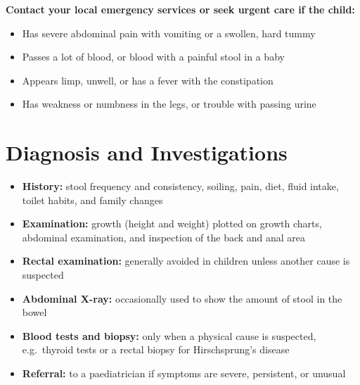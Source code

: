 \textbf{Contact your local emergency services or seek urgent care if the child:}
\begin{itemize}
    \item Has severe abdominal pain with vomiting or a swollen, hard tummy
    \item Passes a lot of blood, or blood with a painful stool in a baby
    \item Appears limp, unwell, or has a fever with the constipation
    \item Has weakness or numbness in the legs, or trouble with passing urine
\end{itemize}

\section*{Diagnosis and Investigations}
\begin{itemize}
    \item \textbf{History:} stool frequency and consistency, soiling, pain, diet, fluid intake, toilet habits, and family changes
    \item \textbf{Examination:} growth (height and weight) plotted on growth charts, abdominal examination, and inspection of the back and anal area
    \item \textbf{Rectal examination:} generally avoided in children unless another cause is suspected
    \item \textbf{Abdominal X-ray:} occasionally used to show the amount of stool in the bowel
    \item \textbf{Blood tests and biopsy:} only when a physical cause is suspected, e.g.\ thyroid tests or a rectal biopsy for Hirschsprung's disease
    \item \textbf{Referral:} to a paediatrician if symptoms are severe, persistent, or unusual
\end{itemize}

